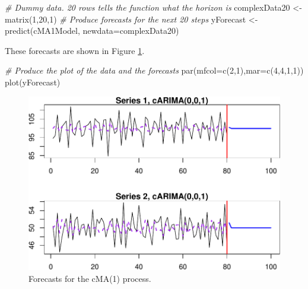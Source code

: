 \documentclass[
]{book}
\newenvironment{Shaded}{\begin{snugshade}}{\end{snugshade}}
\newcommand{\AttributeTok}[1]{\textcolor[rgb]{0.77,0.63,0.00}{#1}}
\newcommand{\CommentTok}[1]{\textcolor[rgb]{0.56,0.35,0.01}{\textit{#1}}}
\newcommand{\DecValTok}[1]{\textcolor[rgb]{0.00,0.00,0.81}{#1}}
\newcommand{\FunctionTok}[1]{\textcolor[rgb]{0.00,0.00,0.00}{#1}}
\newcommand{\NormalTok}[1]{#1}
\newcommand{\OtherTok}[1]{\textcolor[rgb]{0.56,0.35,0.01}{#1}}
\begin{document}
\begin{Shaded}
\begin{Highlighting}[]
\CommentTok{\# Dummy data. 20 rows tells the function what the horizon is}
\NormalTok{complexData20 }\OtherTok{\textless{}{-}} \FunctionTok{matrix}\NormalTok{(}\DecValTok{1}\NormalTok{,}\DecValTok{20}\NormalTok{,}\DecValTok{1}\NormalTok{)}
\CommentTok{\# Produce forecasts for the next 20 steps}
\NormalTok{yForecast }\OtherTok{\textless{}{-}} \FunctionTok{predict}\NormalTok{(cMA1Model, }\AttributeTok{newdata=}\NormalTok{complexData20)}
\end{Highlighting}
\end{Shaded}

These forecasts are shown in Figure \ref{fig:complexMA1Forecast}.

\begin{Shaded}
\begin{Highlighting}[]
\CommentTok{\# Produce the plot of the data and the forecasts}
\FunctionTok{par}\NormalTok{(}\AttributeTok{mfcol=}\FunctionTok{c}\NormalTok{(}\DecValTok{2}\NormalTok{,}\DecValTok{1}\NormalTok{),}\AttributeTok{mar=}\FunctionTok{c}\NormalTok{(}\DecValTok{4}\NormalTok{,}\DecValTok{4}\NormalTok{,}\DecValTok{1}\NormalTok{,}\DecValTok{1}\NormalTok{))}
\FunctionTok{plot}\NormalTok{(yForecast)}
\end{Highlighting}
\end{Shaded}

\begin{figure}
\centering
\includegraphics{Svetunkov---Svetunkov---Complex-Valued-Econometrics_files/figure-latex/complexMA1Forecast-1.pdf}
\caption{\label{fig:complexMA1Forecast}Forecasts for the cMA(1) process.}
\end{figure}
\end{document}
